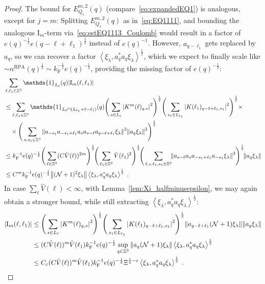 \documentclass[12pt,a4paper]{article}
\numberwithin{equation}{section}
\newcommand{\1}{\mathbb{I}}
\newcommand{\F}{\mathrm{F}}
\newcommand{\I}{\mathrm{I}}
\newcommand{\RPA}{\mathrm{RPA}}
\newcommand{\Zstar}{\mathbb{Z}^3} %
\newcommand{\Z}{\mathbb{Z}}
\newcommand{\NN}{\mathcal{N}}
\newcommand{\half}{\frac{1}{2}}
\newcommand{\eva}[1]{\left\langle #1 \right\rangle}
\theoremstyle{plain}
\theoremstyle{definition}
\theoremstyle{remark}
\theoremstyle{plain}
\theoremstyle{definition}
\theoremstyle{remark}
\begin{document}
\begin{proof}
The bound for $ E^{m,2}_{Q_1}(q) $ (compare~\eqref{eq:expandedEQ1}) is analogous, except for $ j = m $: Splitting $ E^{m,2}_{Q_1}(q) $ as in~\eqref{eq:EQ1111}, and bounding the analogous $ \I_m $-term via~\eqref{eq:estEQ1113_Coulomb} would result in a factor of $ e(q)^{-\half} e(q-\ell+\ell_1)^{\half} $ instead of $ e(q)^{-1} $. However, $ a_{q-\ell_1} $ gets replaced by $ a_q $, so we can recover a factor $ \eva{\xi_\lambda, a_q^* a_q \xi_\lambda}^{\half} $, which we expect to finally scale like $ \sim n^{\RPA}(q)^{\half} \sim k_{\F}^{-\half} e(q)^{-\half} $, providing the missing factor of $ e(q)^{-\half} $: 
\begin{align}
		&\sum_{\ell,\ell_1 \in \Zstar} \mathds{1}_{L_\ell}(q) |\I_m(\ell, \ell_1)| \nonumber\\
		&\leq \sum_{\ell,\ell_1 \in \Zstar} \mathds{1}_{L_\ell \cap (L_{\ell_1}+\ell-\ell_1) }(q)
		\Bigg(\sum\limits_{s \in L_{\ell}} \abs{K^m(\ell)_{q,s}}^2\Bigg)^\half
		\Bigg(\sum\limits_{s_1 \in L_{\ell_1}} \abs{K(\ell_1)_{q-\ell+\ell_1,s_1}}^2\Bigg)^\half \times \nonumber\\
		&\quad \times \Bigg( \sum_{s,s_1 \in \Z^3} \norm{ a_{-s_1} a_{-s_1+\ell_1} a_s a_{s-\ell} a_{q-\ell+\ell_1} \xi_\lambda}^2
		\norm{ a_q \xi_\lambda }^2 \Bigg)^{\half} \nonumber\\
		&\leq k_{\F}^{-1} e(q)^{-\frac 12}
		\Bigg(\sum_{\ell \in \Zstar} (C \hat{V}(\ell))^{2m} \Bigg)^\half \!
		\Bigg(\sum_{\ell_1 \in \Zstar} \hat{V}(\ell_1)^2 \Bigg)^\half \!
		\Bigg( \sum_{\ell, s, \ell_1, s_1 \in \Z^3}  \!\!\norm{ a_{s-\ell} a_s a_{-s_1+\ell_1} a_{-s_1} \xi_\lambda}^2\Bigg)^{\half} \!
		\norm{ a_q \xi_\lambda }  \nonumber\\
		&\leq C^m k_{\F}^{-1} e(q)^{-\frac 12}
			\norm{ (\NN+1)^2 \xi_\lambda }
			\eva{\xi_{\lambda},a_q^* a_q\xi_{\lambda}}^{\half} \;. \label{eq:estEQ1113_Coulomb_bis}
\end{align}
In case $ \sum_\ell \hat{V}(\ell) < \infty $, with Lemma~\ref{lem:Xi_halfminusepsilon}, we may again obtain a stronger bound, while still extracting $ \eva{\xi_\lambda, a_q^* a_q \xi_\lambda}^{\half} $:
\begin{align}
		|\I_m(\ell, \ell_1)|
		&\leq \Bigg(\sum\limits_{s \in L_{\ell}} \abs{K^m(\ell)_{q,s}}^2\Bigg)^\half
		\Bigg(\sum\limits_{s_1 \in L_{\ell_1}} \abs{K(\ell_1)_{q-\ell+\ell_1,s_1}}^2\Bigg)^\half
		\norm{ a_{q-\ell+\ell_1} (\NN+1) \xi_\lambda}
		\norm{ a_q \xi_\lambda }\nonumber\\
		&\leq (C \hat{V}(\ell))^m \hat{V}(\ell_1) k_{\F}^{-1} e(q)^{-\half}
		\sup_{q \in \Z^3} \norm{ a_q (\NN+1) \xi_\lambda }
		\eva{\xi_{\lambda},a_q^* a_q\xi_{\lambda}}^{\half} \nonumber\\
		&\leq C_\varepsilon (C \hat{V}(\ell))^m
		\hat{V}(\ell_1)
		k_{\F}^{-1} e(q)^{-\half} \Xi^{\half-\varepsilon} \eva{\xi_{\lambda},a_q^* a_q\xi_{\lambda}}^{\half} \;. \label{eq:estEQ1113_bis}
\end{align}
\end{proof}
\end{document}
